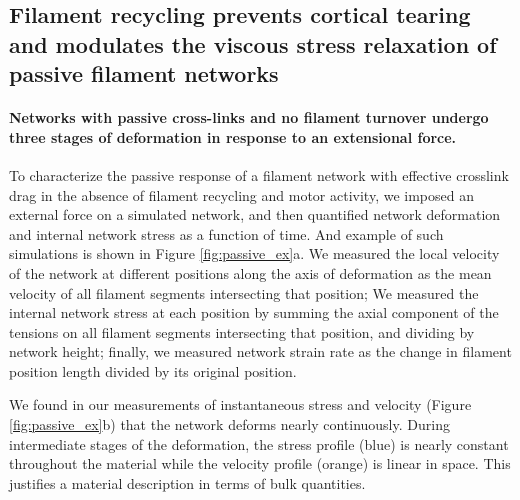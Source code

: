 \documentclass[10pt,letterpaper]{article}
\begin{document}
\subsection*{Filament recycling prevents cortical tearing and modulates the viscous stress relaxation of passive filament networks}
 
\paragraph{Networks with passive cross-links and no filament turnover undergo three stages of deformation in response to an extensional force.} 
To characterize the passive response of a filament network with effective crosslink drag in the absence of filament recycling and motor activity, we imposed an external force on a simulated network, and then quantified network deformation and internal network stress as a function of time. And example of such simulations is shown in Figure \ref{fig:passive_ex}a.  We measured the local velocity of the network at different positions along the axis of deformation as the mean velocity of all filament segments intersecting that position;  We measured the internal network stress at each position by summing the axial component of the tensions on all filament segments intersecting that position, and dividing by network height;  finally, we measured network strain rate as the change in filament position length divided by its original position.   

We found in our measurements of instantaneous stress and velocity (Figure \ref{fig:passive_ex}b) that the network deforms nearly continuously.  During intermediate stages of the deformation, the stress profile (blue) is nearly constant throughout the material while the velocity profile (orange) is linear in space.  This justifies a material description in terms of bulk quantities.
\end{document}
